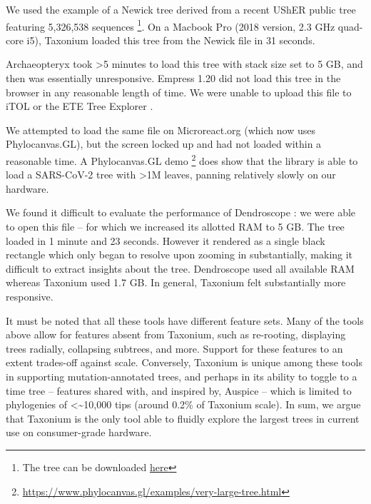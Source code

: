 \documentclass[twocolumn]{bioRxiv}
\begin{document}
We used the example of a Newick tree derived from a recent UShER public tree \citep{McBroome2021} featuring 5,326,538 sequences \footnote{The tree can be downloaded \href{https://hgwdev.gi.ucsc.edu/~angie/UShER\_SARS-CoV-2/2022/05/17/public-2022-05-17.all.nwk.gz}{here}}. On a Macbook Pro (2018 version, 2.3 GHz quad-core i5), Taxonium loaded this tree from the Newick file in 31 seconds. 

Archaeopteryx \citep{archaeopteryx} took >5 minutes to load this tree with stack size set to 5 GB, and then was essentially unresponsive. Empress 1.20 \citep{CantrellFedarko2021empress} did not load this tree in the browser in any reasonable length of time. We were unable to upload this file to iTOL \citep{itol} or the ETE Tree Explorer \citep{ete}.

We attempted to load the same file on Microreact.org \citep{argimon2016microreact} (which now uses Phylocanvas.GL), but the screen locked up and had not loaded within a reasonable time. A Phylocanvas.GL demo \footnote{\url{https://www.phylocanvas.gl/examples/very-large-tree.html}} does show that the library \citep{abudahab2021phylocanvas} is able to load a SARS-CoV-2 tree with >1M leaves, panning relatively slowly on our hardware.

We found it difficult to evaluate the performance of Dendroscope \citep{pmid18034891}: we were able to open this file -- for which we increased its allotted RAM to 5 GB. The tree loaded in 1 minute and 23 seconds. However it rendered as a single black rectangle which only began to resolve upon zooming in substantially, making it difficult to extract insights about the tree. Dendroscope used all available RAM whereas Taxonium used 1.7 GB. In general, Taxonium felt substantially more responsive.


It must be noted that all these tools have different feature sets. Many of the tools above allow for features absent from Taxonium, such as re-rooting, displaying trees radially, collapsing subtrees, and more. Support for these features to an extent trades-off against scale. Conversely, Taxonium is unique among these tools in supporting mutation-annotated trees, and perhaps in its ability to toggle to a time tree -- features shared with, and inspired by, Auspice \citep{Nextstrain} -- which is limited to phylogenies of <\textasciitilde10,000 tips (around 0.2\% of  Taxonium scale). In sum, we argue that Taxonium is the only tool able to fluidly explore the largest trees in current use on consumer-grade hardware.
\end{document}
